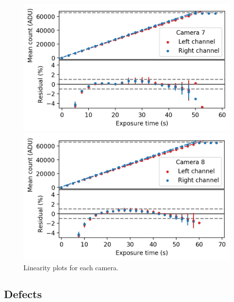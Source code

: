 \begin{colsection}
\begin{colsection}
\begin{figure}[p]
\begin{center}
        \begin{minipage}[t]{0.49\textwidth}\vspace{10pt}
            \includegraphics[width=\linewidth]{images/detectors/lin_7.png}
        \end{minipage}
        \begin{minipage}[t]{0.49\textwidth}\vspace{10pt}
            \includegraphics[width=\linewidth]{images/detectors/lin_8.png}
        \end{minipage}
    \end{center}
    \caption[Linearity plots]{
        Linearity plots for each camera.
        }\label{fig:lin}
\end{figure}

\clearpage

\end{colsection}

\newpage
\subsection{Defects}
\label{sec:defects}
\begin{colsection}


\end{colsection}
\end{colsection}
